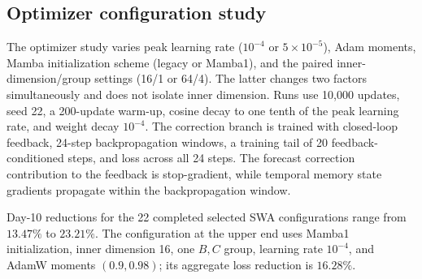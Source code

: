 \documentclass{article}
\newcommand{\vfourchange}[1]{{\color{blue}#1}}
\begin{document}
\FloatBarrier
\subsection{\texorpdfstring{{Optimizer configuration study}}{Optimizer configuration study}}
\label{app:optimizer_study}
\vfourchange{{These optimizer comparisons use the 2022 development set.}}
The optimizer study varies peak learning rate ($10^{-4}$ or $5\times10^{-5}$), Adam moments, Mamba initialization scheme (legacy or Mamba1), and the paired inner-dimension/group settings (16/1 or 64/4). The latter changes two factors simultaneously and does not isolate inner dimension. Runs use 10,000 updates, seed 22, a 200-update warm-up, cosine decay to one tenth of the peak learning rate, and weight decay $10^{-4}$. {The correction branch is trained} with closed-loop feedback, 24-step backpropagation windows, a training tail of 20 feedback-conditioned steps, and loss across all 24 steps. {The forecast correction contribution to the feedback} is stop-gradient, while temporal memory state gradients propagate within the backpropagation window.

Day-10 reductions for the 22 completed selected SWA configurations range from $13.47\%$ to $23.21\%$. The configuration at the upper end uses Mamba1 initialization, inner dimension 16, one $B,C$ group, learning rate $10^{-4}$, and AdamW moments $(0.9,0.98)$; its aggregate loss reduction is $16.28\%$.
\end{document}
